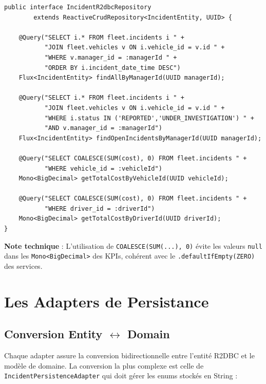 \documentclass[12pt,a4paper]{report}
\begin{document}
\begin{lstlisting}[style=javaStyle, caption={Requêtes avancées du repository Incident}]
public interface IncidentR2dbcRepository
        extends ReactiveCrudRepository<IncidentEntity, UUID> {

    @Query("SELECT i.* FROM fleet.incidents i " +
           "JOIN fleet.vehicles v ON i.vehicle_id = v.id " +
           "WHERE v.manager_id = :managerId " +
           "ORDER BY i.incident_date_time DESC")
    Flux<IncidentEntity> findAllByManagerId(UUID managerId);

    @Query("SELECT i.* FROM fleet.incidents i " +
           "JOIN fleet.vehicles v ON i.vehicle_id = v.id " +
           "WHERE i.status IN ('REPORTED','UNDER_INVESTIGATION') " +
           "AND v.manager_id = :managerId")
    Flux<IncidentEntity> findOpenIncidentsByManagerId(UUID managerId);

    @Query("SELECT COALESCE(SUM(cost), 0) FROM fleet.incidents " +
           "WHERE vehicle_id = :vehicleId")
    Mono<BigDecimal> getTotalCostByVehicleId(UUID vehicleId);

    @Query("SELECT COALESCE(SUM(cost), 0) FROM fleet.incidents " +
           "WHERE driver_id = :driverId")
    Mono<BigDecimal> getTotalCostByDriverId(UUID driverId);
}
\end{lstlisting}

\textbf{Note technique} : L'utilisation de \texttt{COALESCE(SUM(...), 0)} évite les valeurs \texttt{null} dans les \texttt{Mono<BigDecimal>} des KPIs, cohérent avec le \texttt{.defaultIfEmpty(ZERO)} des services.

\section{Les Adapters de Persistance}

\subsection{Conversion Entity $\leftrightarrow$ Domain}

Chaque adapter assure la conversion bidirectionnelle entre l'entité R2DBC et le modèle de domaine. La conversion la plus complexe est celle de \texttt{IncidentPersistenceAdapter} qui doit gérer les enums stockés en String :
\end{document}
